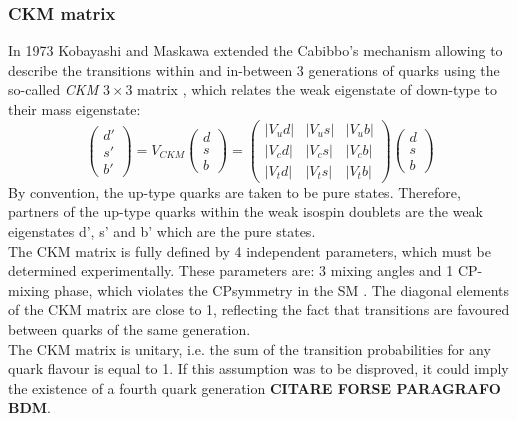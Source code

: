 \subsubsection{CKM matrix}
In 1973 Kobayashi and Maskawa extended the Cabibbo's mechanism allowing to describe the transitions within and in-between 3 generations of quarks
using the so-called \textit{CKM} $3\times3$ matrix \cite{cabibbo,ckm}, which relates the weak eigenstate of down-type to their mass eigenstate:
\begin{equation}
	\begin{pmatrix}
	d' \\ 
	s' \\ 
	b' 
	\end{pmatrix} 
	= V_{CKM}
	\begin{pmatrix}
	d \\ 
	s \\ 
	b
	\end{pmatrix} 
	=
	\begin{pmatrix}
	|V_ud| & |V_us| & |V_ub| \\ 
	|V_cd| & |V_cs| & |V_cb| \\ 
	|V_td| & |V_ts|  &| V_tb|
	\end{pmatrix} 
	\begin{pmatrix}
	d \\ 
	s \\ 
	b
	\end{pmatrix} 
\end{equation}
By  convention, the up-type quarks are taken to be pure states.
Therefore, partners of the up-type quarks within the weak isospin doublets are the weak eigenstates d’, s’ and b’ which are the pure states. \\
The CKM matrix is fully defined by 4 independent parameters, which must be determined experimentally. These parameters are: 3 mixing angles and 1 CP-mixing
phase, which violates the CP\footnotemark symmetry in the SM \cite{cp_vio}.
The diagonal elements of the CKM matrix are close to 1, reflecting the fact that transitions are favoured between quarks of the same generation. \\
The CKM matrix is unitary, i.e. the sum of the transition probabilities for any quark flavour is equal to 1. If this assumption was to be disproved, 
it could imply the existence of a fourth quark generation \textbf{CITARE FORSE PARAGRAFO BDM}.


